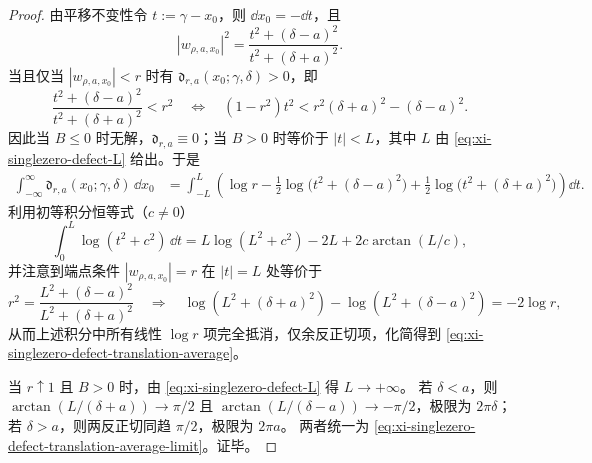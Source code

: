 \begin{proof}
由平移不变性令 \(t:=\gamma-x_0\)，则 \(\dd x_0=-\dd t\)，且
\[
|w_{\rho,a,x_0}|^2
=\frac{t^2+(\delta-a)^2}{t^2+(\delta+a)^2}.
\]
当且仅当 \(|w_{\rho,a,x_0}|<r\) 时有 \(\mathfrak d_{r,a}(x_0;\gamma,\delta)>0\)，即
\[
\frac{t^2+(\delta-a)^2}{t^2+(\delta+a)^2}<r^2
\quad\Longleftrightarrow\quad
(1-r^2)t^2<r^2(\delta+a)^2-(\delta-a)^2.
\]
因此当 \(B\le 0\) 时无解，\(\mathfrak d_{r,a}\equiv 0\)；当 \(B>0\) 时等价于 \(|t|<L\)，其中 \(L\) 由
\eqref{eq:xi-singlezero-defect-L} 给出。于是
\begin{align*}
\int_{-\infty}^{\infty}\mathfrak d_{r,a}(x_0;\gamma,\delta)\,\dd x_0
&=\int_{-L}^{L}\left(\log r-\frac12\log\bigl(t^2+(\delta-a)^2\bigr)+\frac12\log\bigl(t^2+(\delta+a)^2\bigr)\right)\dd t.
\end{align*}
利用初等积分恒等式（\(c\neq 0\)）
\[
\int_0^L\log(t^2+c^2)\,\dd t
=L\log(L^2+c^2)-2L+2c\arctan(L/c),
\]
并注意到端点条件 \(|w_{\rho,a,x_0}|=r\) 在 \(|t|=L\) 处等价于
\[
r^2=\frac{L^2+(\delta-a)^2}{L^2+(\delta+a)^2}
\quad\Longrightarrow\quad
\log(L^2+(\delta+a)^2)-\log(L^2+(\delta-a)^2)=-2\log r,
\]
从而上述积分中所有线性 \(\log r\) 项完全抵消，仅余反正切项，化简得到
\eqref{eq:xi-singlezero-defect-translation-average}。

当 \(r\uparrow 1\) 且 \(B>0\) 时，由 \eqref{eq:xi-singlezero-defect-L} 得 \(L\to+\infty\)。
若 \(\delta<a\)，则 \(\arctan(L/(\delta+a))\to\pi/2\) 且 \(\arctan(L/(\delta-a))\to-\pi/2\)，极限为 \(2\pi\delta\)；
若 \(\delta>a\)，则两反正切同趋 \(\pi/2\)，极限为 \(2\pi a\)。
两者统一为 \eqref{eq:xi-singlezero-defect-translation-average-limit}。证毕。
\end{proof}

